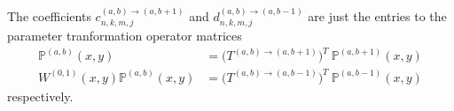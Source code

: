 \documentclass[11pt, oneside]{article}   	%
\newcommand{\bigP}{\mathbb{P}}
\begin{document}
The coefficients $c_{n,k,m,j}^{(a,b)\to(a,b+1)}$ and $d_{n,k,m,j}^{(a,b)\to(a,b-1)}$ are just the entries to the parameter tranformation operator matrices
\begin{align}
	\bigP^{(a,b)}(x,y) &= \Big(T^{(a,b)\to(a,b+1)} \Big)^T \: \bigP^{(a,b+1)}(x,y) \\
	W^{(0,1)}(x,y) \bigP^{(a,b)}(x,y) &= \Big(T^{(a,b)\to(a,b-1)} \Big)^T \: \bigP^{(a,b-1)}(x,y)
\end{align}
respectively.





\end{document}
